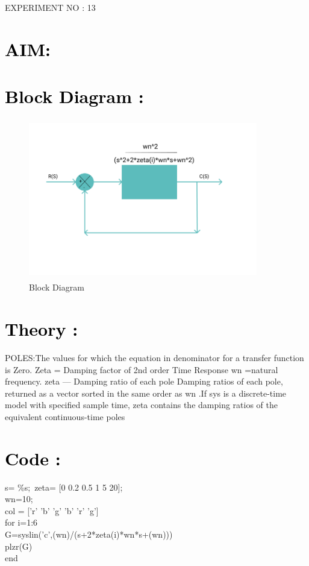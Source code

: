 \documentclass[12pt]{article}
\begin{document}
\begin{center}
    \LARGE {EXPERIMENT NO : 13}
             
\end{center}

\section*{\textcolor{black}{AIM: }}

\section*{\textcolor{black}{Block Diagram :}}

\begin{figure}[!hth]
        \centering
        \includegraphics[width =10cm, height = 7cm]{images/damping factor.png}
        \caption{Block Diagram}
        \label{Graph}
\end{figure}

\section*{\textcolor{black}{Theory :}}
POLES:The values for which the equation in denominator for a transfer function is Zero.
 Zeta = Damping factor of 2nd order Time Response 
  wn =natural frequency.
zeta — Damping ratio of each pole
Damping ratios of each pole, returned as a vector sorted in the same order as wn .If sys is a discrete-time model with specified sample time, zeta contains the damping ratios of the equivalent continuous-time poles
 \par

\section*{\textcolor{black}{Code :}}
s= \%s;\ 
zeta= [0 0.2 0.5 1 5 20];\\
wn=10;\\
col = ['r' 'b' 'g' 'b' 'r' 'g']\\
for i=1:6\\
     G=syslin('c',(wn)/(s+2*zeta(i)*wn*s+(wn)))\\
     plzr(G)\\
end\\
\end{document}
